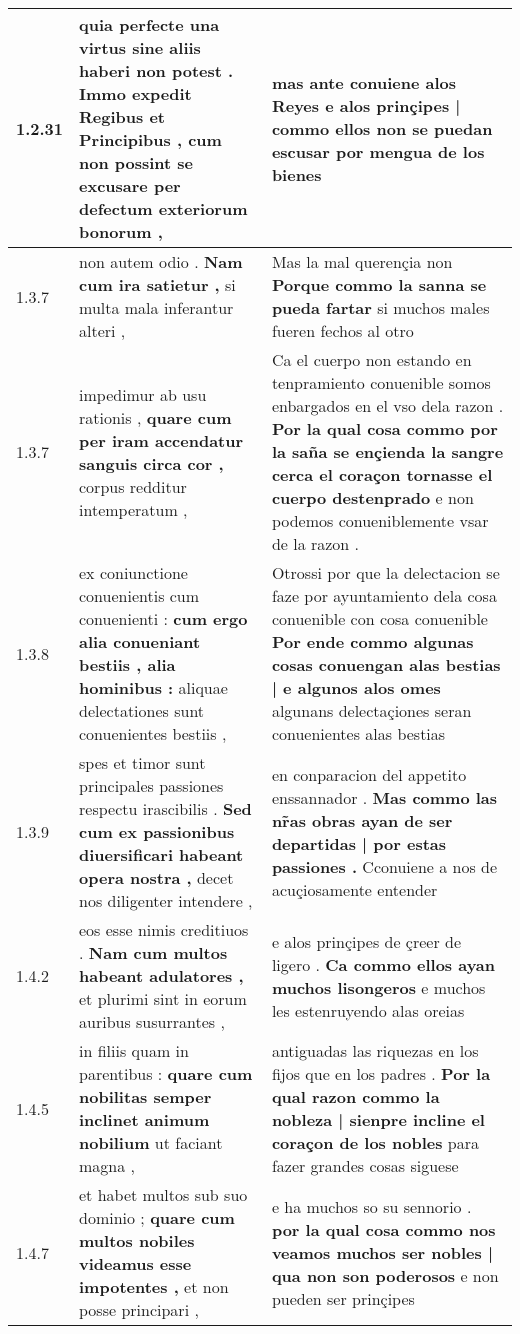 \begin{tabular}{|p{1cm}|p{6.5cm}|p{6.5cm}|}
1.2.31 & quia perfecte una virtus sine aliis haberi non potest . Immo expedit Regibus et Principibus , \textbf{ cum non possint se excusare } per defectum exteriorum bonorum , & mas ante conuiene alos Reyes \textbf{ e alos prinçipes | commo ellos non se puedan escusar } por mengua de los bienes \\\hline
1.3.7 & non autem odio . \textbf{ Nam cum ira satietur , } si multa mala inferantur alteri , & Mas la mal querençia non \textbf{ Porque commo la sanna se pueda fartar } si muchos males fueren fechos al otro \\\hline
1.3.7 & impedimur ab usu rationis , \textbf{ quare cum per iram accendatur sanguis circa cor , } corpus redditur intemperatum , & Ca el cuerpo non estando en tenpramiento conuenible somos enbargados en el vso dela razon . \textbf{ Por la qual cosa commo por la saña se ençienda la sangre cerca el coraçon tornasse el cuerpo destenprado } e non podemos conueniblemente vsar de la razon . \\\hline
1.3.8 & ex coniunctione conuenientis cum conuenienti : \textbf{ cum ergo alia conueniant bestiis , alia hominibus : } aliquae delectationes sunt conuenientes bestiis , & Otrossi por que la delectacion se faze por ayuntamiento dela cosa conuenible con cosa conuenible \textbf{ Por ende commo algunas cosas conuengan alas bestias | e algunos alos omes } algunans delectaçiones seran conuenientes alas bestias \\\hline
1.3.9 & spes et timor sunt principales passiones respectu irascibilis . \textbf{ Sed cum ex passionibus diuersificari habeant opera nostra , } decet nos diligenter intendere , & en conparacion del appetito enssannador . \textbf{ Mas commo las nr̃as obras ayan de ser departidas | por estas passiones . } Cconuiene a nos de acuçiosamente entender \\\hline
1.4.2 & eos esse nimis creditiuos . \textbf{ Nam cum multos habeant adulatores , } et plurimi sint in eorum auribus susurrantes , & e alos prinçipes de çreer de ligero . \textbf{ Ca commo ellos ayan muchos lisongeros } e muchos les estenruyendo alas oreias \\\hline
1.4.5 & in filiis quam in parentibus : \textbf{ quare cum nobilitas semper inclinet animum nobilium } ut faciant magna , & antiguadas las riquezas en los fijos que en los padres . \textbf{ Por la qual razon commo la nobleza | sienpre incline el coraçon de los nobles } para fazer grandes cosas siguese \\\hline
1.4.7 & et habet multos sub suo dominio ; \textbf{ quare cum multos nobiles videamus esse impotentes , } et non posse principari , & e ha muchos so su sennorio . \textbf{ por la qual cosa commo nos veamos muchos ser nobles | qua non son poderosos } e non pueden ser prinçipes \\\hline

\end{tabular}
